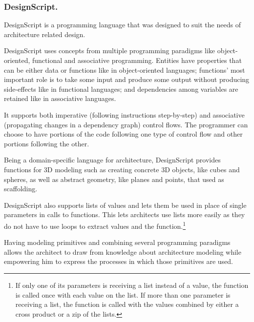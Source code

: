 \documentclass{./llncs2e/llncs}
\begin{document}
\subsubsection{DesignScript.}
	DesignScript\cite{aish2012designscript} is a programming language that was designed to suit the needs of architecture related design.
	
	
	DesignScript uses concepts from multiple programming paradigms like object-oriented, functional and associative programming. 
	Entities have properties that can be either data or functions like in object-oriented languages; functions' most important role is to take some input and produce some output without producing side-effects like in functional languages; and dependencies among variables are retained like in associative languages.
	
	It supports both imperative (following instructions step-by-step) and associative (propagating changes in a dependency graph) control flows. 
	The programmer can choose to have portions of the code following one type of control flow and other portions following the other.
	
	Being a domain-specific language for architecture, DesignScript provides functions for 3D modeling such as creating concrete 3D objects, like cubes and spheres, as well as abstract geometry, like planes and points, that used as scaffolding.
	
	DesignScript also supports lists of values and lets them be used in place of single parameters in calls to functions.
	This lets architects use lists more easily as they do not have to use loops to extract values and the function.\footnote{If only one of its parameters is receiving a list instead of a value, the function is called once with each value on the list.
	If more than one parameter is receiving a list, the function is called with the values combined by either a cross product or a zip of the lists.}
	
	Having modeling primitives and combining several programming paradigms allows the architect to draw from knowledge about architecture modeling while empowering him to express the processes in which those primitives are used.
	
\end{document}
